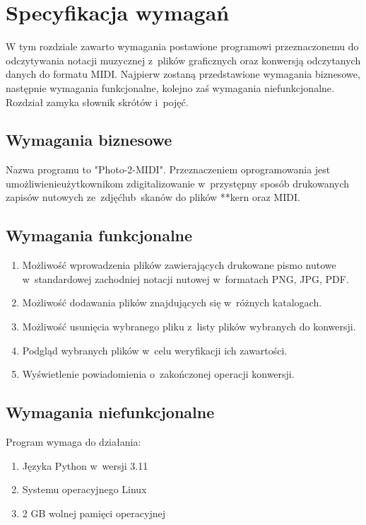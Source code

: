 \chapter{Specyfikacja wymagań}
W tym rozdziale zawarto wymagania postawione programowi przeznaczonemu do odczytywania notacji muzycznej z~plików graficznych oraz konwersją odczytanych danych do formatu MIDI. \linebreak Najpierw zostaną przedstawione wymagania biznesowe, następnie wymagania funkcjonalne, kolejno zaś wymagania niefunkcjonalne. Rozdział zamyka słownik skrótów i~pojęć.

\section{Wymagania biznesowe}
Nazwa programu to "Photo-2-MIDI". Przeznaczeniem oprogramowania jest umożliwienie\linebreak użytkownikom zdigitalizowanie w~przystępny sposób drukowanych zapisów nutowych ze~zdjęć\linebreak lub~skanów do plików **kern oraz MIDI.

\section{Wymagania funkcjonalne}
	\begin{enumerate}
		\item Możliwość wprowadzenia plików zawierających drukowane pismo nutowe w~standardowej zachodniej notacji nutowej w~formatach PNG, JPG, PDF.
		\item Możliwość dodawania plików znajdujących się w~różnych katalogach.
		\item Możliwość usunięcia wybranego pliku z~listy plików wybranych do konwersji.
		\item Podgląd wybranych plików w~celu weryfikacji ich zawartości.
		\item Wyświetlenie powiadomienia o~zakończonej operacji konwersji.
	\end{enumerate}
	
	
\section{Wymagania niefunkcjonalne}
Program wymaga do działania:
	\begin{enumerate}
		\item Języka Python w~wersji 3.11
		\item Systemu operacyjnego Linux
		\item 2 GB wolnej pamięci operacyjnej
	\end{enumerate}
	

